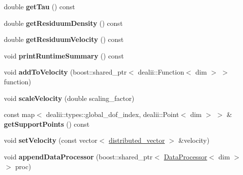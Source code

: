 \begin{DoxyCompactItemize}
\item 
\hypertarget{classnatrium_1_1CFDSolver_ac34fdc9baa1219418385ebb0c3daefde}{
double {\bfseries getTau} () const }
\label{classnatrium_1_1CFDSolver_ac34fdc9baa1219418385ebb0c3daefde}

\item 
\hypertarget{classnatrium_1_1CFDSolver_a1a508263caff799245a183989efd6680}{
double {\bfseries getResiduumDensity} () const }
\label{classnatrium_1_1CFDSolver_a1a508263caff799245a183989efd6680}

\item 
\hypertarget{classnatrium_1_1CFDSolver_a051ad2daa843e9edf9f1243b3c062686}{
double {\bfseries getResiduumVelocity} () const }
\label{classnatrium_1_1CFDSolver_a051ad2daa843e9edf9f1243b3c062686}

\item 
\hypertarget{classnatrium_1_1CFDSolver_adcec28e954e67146878eaffa5bd1e005}{
void {\bfseries printRuntimeSummary} () const }
\label{classnatrium_1_1CFDSolver_adcec28e954e67146878eaffa5bd1e005}

\item 
\hypertarget{classnatrium_1_1CFDSolver_ab0c53c0334f811311abd169288908fe1}{
void {\bfseries addToVelocity} (boost::shared\_\-ptr$<$ dealii::Function$<$ dim $>$ $>$ function)}
\label{classnatrium_1_1CFDSolver_ab0c53c0334f811311abd169288908fe1}

\item 
\hypertarget{classnatrium_1_1CFDSolver_af66c5e23e8717ce8c20593151100eacc}{
void {\bfseries scaleVelocity} (double scaling\_\-factor)}
\label{classnatrium_1_1CFDSolver_af66c5e23e8717ce8c20593151100eacc}

\item 
\hypertarget{classnatrium_1_1CFDSolver_acd5c6682dbd27a55d41f90187bfc8796}{
const map$<$ dealii::types::global\_\-dof\_\-index, dealii::Point$<$ dim $>$ $>$ \& {\bfseries getSupportPoints} () const }
\label{classnatrium_1_1CFDSolver_acd5c6682dbd27a55d41f90187bfc8796}

\item 
\hypertarget{classnatrium_1_1CFDSolver_a360326bf8a6523bdbbc4feb947ef9ef1}{
void {\bfseries setVelocity} (const vector$<$ \hyperlink{namespacenatrium_a903d2b92917f582f2ff05f52160ab811}{distributed\_\-vector} $>$ \&velocity)}
\label{classnatrium_1_1CFDSolver_a360326bf8a6523bdbbc4feb947ef9ef1}

\item 
\hypertarget{classnatrium_1_1CFDSolver_a1b7e3e18b8c8e035c7573ca01b83875a}{
void {\bfseries appendDataProcessor} (boost::shared\_\-ptr$<$ \hyperlink{classnatrium_1_1DataProcessor}{DataProcessor}$<$ dim $>$ $>$ proc)}
\label{classnatrium_1_1CFDSolver_a1b7e3e18b8c8e035c7573ca01b83875a}


\end{DoxyCompactItemize}
